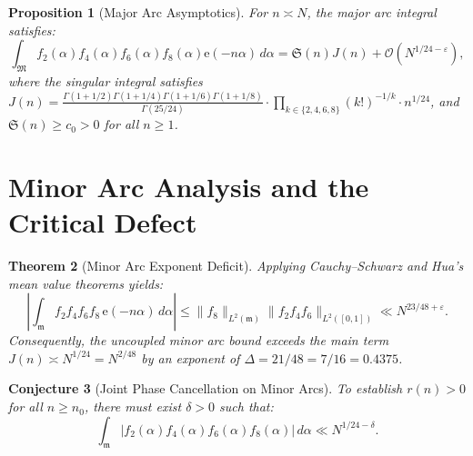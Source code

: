 \documentclass[11pt,reqno]{amsart}
\newtheorem{theorem}{Theorem}[section]
\newtheorem{proposition}[theorem]{Proposition}
\newtheorem{conjecture}[theorem]{Conjecture}
\theoremstyle{remark}
\newcommand{\e}{\mathrm{e}}
\newcommand{\m}{\mathfrak{m}}
\newcommand{\M}{\mathfrak{M}}
\begin{document}
\begin{proposition}[Major Arc Asymptotics]
For $n \asymp N$, the major arc integral satisfies:
\begin{equation}
    \int_{\M} f_2(\alpha) f_4(\alpha) f_6(\alpha) f_8(\alpha) \e(-n\alpha) \, d\alpha = \mathfrak{S}(n) J(n) + \mathcal{O}\left(N^{1/24 - \varepsilon}\right),
\end{equation}
where the singular integral satisfies $J(n) = \frac{\Gamma(1+1/2)\Gamma(1+1/4)\Gamma(1+1/6)\Gamma(1+1/8)}{\Gamma(25/24)} \cdot \prod_{k \in \{2,4,6,8\}} (k!)^{-1/k} \cdot n^{1/24}$, and $\mathfrak{S}(n) \ge c_0 > 0$ for all $n \ge 1$.
\end{proposition}

\section{Minor Arc Analysis and the Critical Defect}

\begin{theorem}[Minor Arc Exponent Deficit]
Applying Cauchy--Schwarz and Hua's mean value theorems yields:
\begin{equation}
    \left| \int_{\m} f_2 f_4 f_6 f_8 \, \e(-n\alpha) \, d\alpha \right| \le \|f_8\|_{L^2(\m)} \|f_2 f_4 f_6\|_{L^2([0,1])} \ll N^{23/48 + \varepsilon}.
\end{equation}
Consequently, the uncoupled minor arc bound exceeds the main term $J(n) \asymp N^{1/24} = N^{2/48}$ by an exponent of $\Delta = 21/48 = 7/16 = 0.4375$.
\end{theorem}

\begin{conjecture}[Joint Phase Cancellation on Minor Arcs]
To establish $r(n) > 0$ for all $n \ge n_0$, there must exist $\delta > 0$ such that:
\begin{equation}
    \int_{\m} |f_2(\alpha) f_4(\alpha) f_6(\alpha) f_8(\alpha)| \, d\alpha \ll N^{1/24 - \delta}.
\end{equation}
\end{conjecture}
\end{document}
